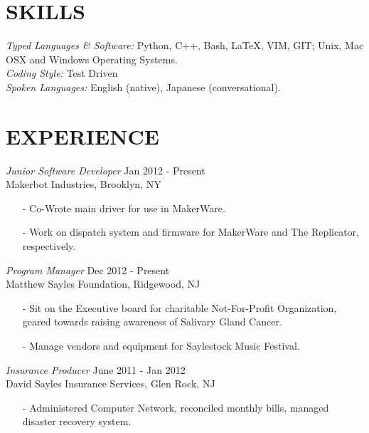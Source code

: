 \documentclass[margin, 10pt]{res} %
\begin{document}
\begin{resume}
\section{SKILLS} 

{\sl Typed Languages \& Software:}
Python, C++, Bash, \LaTeX, VIM, GIT; Unix, Mac OSX and Windows Operating Systems. \\
{\sl Coding Style:} Test Driven \\
{\sl Spoken Languages:}
English (native), Japanese (conversational). \\

 
\section{EXPERIENCE}

{\sl Junior Software Developer} \hfill Jan 2012 - Present \\
Makerbot Industries, Brooklyn, NY
\begin{itemize} \itemsep -2pt
\item[-] Co-Wrote main driver for use in MakerWare.
\item[-] Work on dispatch system and firmware for MakerWare and The Replicator, respectively.
\end{itemize}

{\sl Program Manager} \hfill Dec 2012 - Present \\
Matthew Sayles Foundation, Ridgewood, NJ
\begin{itemize} \itemsep -2pt
\item[-] Sit on the Executive board for charitable Not-For-Profit Organization, geared towards raising awareness of Salivary Gland Cancer.
\item[-] Manage vendors and equipment for Saylestock Music Festival.
\end{itemize}

{\sl Insurance Producer} \hfill June 2011 - Jan 2012 \\
David Sayles Insurance Services, Glen Rock, NJ
\begin{itemize} \itemsep -2pt
\item[-] Administered Computer Network, reconciled monthly bills, managed disaster recovery system.
\end{itemize}


\end{resume}
\end{document}
